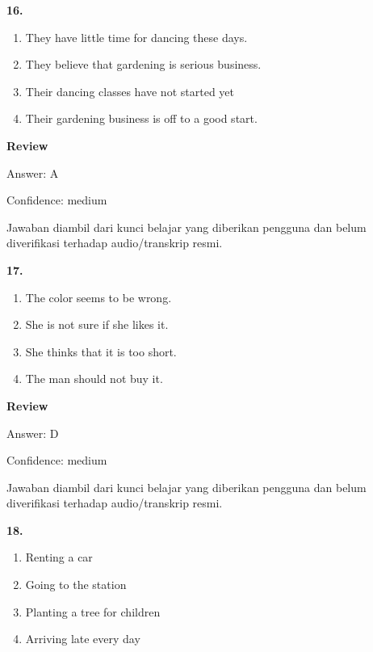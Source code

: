 \documentclass[12pt]{article}
\begin{document}
\endgroup
\par
\vspace{0.25\baselineskip}
\noindent\textbf{16.}
\begin{enumerate}[label=(\Alph*),leftmargin=*,itemsep=0.2em]
\item They have little time for dancing these days.
\item They believe that gardening is serious business.
\item Their dancing classes have not started yet
\item Their gardening business is off to a good start.
\end{enumerate}
\par
\begingroup
\setlength{\parskip}{0pt}
\setlength{\parindent}{0pt}
\textbf{Review}\par
Answer: A\par
Confidence: medium\par
Jawaban diambil dari kunci belajar yang diberikan pengguna dan belum diverifikasi terhadap audio/transkrip resmi.\par
\endgroup
\par
\vspace{0.25\baselineskip}
\noindent\textbf{17.}
\begin{enumerate}[label=(\Alph*),leftmargin=*,itemsep=0.2em]
\item The color seems to be wrong.
\item She is not sure if she likes it.
\item She thinks that it is too short.
\item The man should not buy it.
\end{enumerate}
\par
\begingroup
\setlength{\parskip}{0pt}
\setlength{\parindent}{0pt}
\textbf{Review}\par
Answer: D\par
Confidence: medium\par
Jawaban diambil dari kunci belajar yang diberikan pengguna dan belum diverifikasi terhadap audio/transkrip resmi.\par
\endgroup
\par
\vspace{0.25\baselineskip}
\noindent\textbf{18.}
\begin{enumerate}[label=(\Alph*),leftmargin=*,itemsep=0.2em]
\item Renting a car
\item Going to the station
\item Planting a tree for children
\item Arriving late every day
\end{enumerate}
\end{document}
